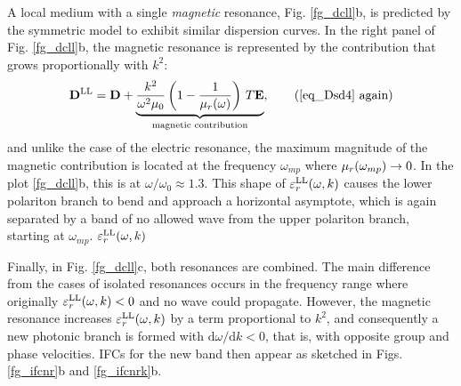 A local medium with a single \textit{magnetic} resonance, Fig. \ref{fg_dcll}b, is predicted by the symmetric model to exhibit similar dispersion curves. In the right panel of Fig. \ref{fg_dcll}b, the magnetic resonance is represented by the
contribution that grows proportionally with $k^2$: 
\begin{equation} \Dsd = \D + \underbrace{\frac{k^2}{\omega^2 \mu_0}\left(1 - \frac{1}{\murl(\omega)}\right) \, T \E}_{\text{magnetic contribution}},      \tag{\ref{eq_Dsd4} \again} \end{equation}
and unlike the case of the electric resonance, the maximum magnitude of the magnetic contribution is located at the frequency $\omega_{mp}$ where $\mu_r(\omega_{mp}) \rightarrow 0$. In the plot \ref{fg_dcll}b, this is at $\omega/\omega_0 \approx 1.3$.
This shape of $\varepsilon_r^\text{LL}(\omega, k)$ causes the lower polariton branch to bend and approach a horizontal asymptote, which is again separated by a band of no allowed wave from the upper polariton branch, starting at $\omega_{mp}$.
$\varepsilon_r^\text{LL}(\omega, k)$

Finally, in Fig. \ref{fg_dcll}c, both resonances are combined. The main difference from the cases of isolated resonances occurs in the frequency range where originally $\varepsilon_r^\text{LL}(\omega, k) < 0$ and no wave could propagate. However, the magnetic resonance increases $\varepsilon_r^\text{LL}(\omega, k)$ by a term proportional to $k^2$, and consequently a new photonic branch is formed with $\mathrm{d}\omega/\mathrm{d}k < 0$, that is, with opposite group and phase velocities. IFCs for the new band then appear as sketched in Figs. \ref{fg_ifcnr}b and \ref{fg_ifcnrk}b.



